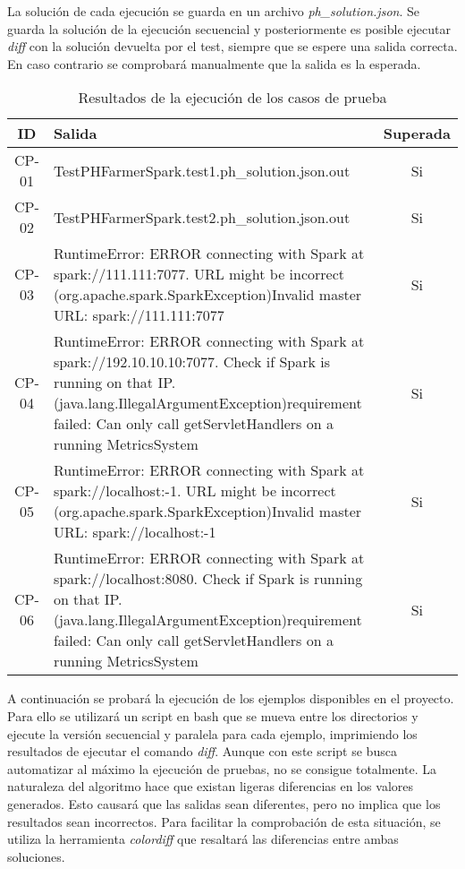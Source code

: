 La solución de cada ejecución se guarda en un archivo \textit{ph\_solution.json}. Se guarda la solución de la ejecución secuencial y posteriormente es posible ejecutar \textit{diff} con la solución devuelta por el test, siempre que se espere una salida correcta. En caso contrario se comprobará manualmente que la salida es la esperada.\\

\begin{table} [H]
    \begin{tabularx}{\linewidth}{|c|X|c|}
        \hline
        \textbf{ID} & \centering \textbf{Salida} & \textbf{Superada} \tabularnewline
        \hline
        CP-01 & TestPHFarmerSpark.test1.ph\_solution.json.out & Si \tabularnewline
        \hline
        CP-02 & TestPHFarmerSpark.test2.ph\_solution.json.out & Si \tabularnewline
        \hline
        CP-03 & RuntimeError: ERROR connecting with Spark at spark://111.111:7077. URL might be incorrect (org.apache.spark.SparkException)Invalid master URL: spark://111.111:7077 & Si \tabularnewline
        \hline
        CP-04 & RuntimeError: ERROR connecting with Spark at spark://192.10.10.10:7077. Check if Spark is running on that IP. (java.lang.IllegalArgumentException)requirement failed: Can only call getServletHandlers on a running MetricsSystem & Si \tabularnewline
        \hline
        CP-05 & RuntimeError: ERROR connecting with Spark at spark://localhost:-1. URL might be incorrect (org.apache.spark.SparkException)Invalid master URL: spark://localhost:-1 & Si \tabularnewline
        \hline
        CP-06 & RuntimeError: ERROR connecting with Spark at spark://localhost:8080. Check if Spark is running on that IP. (java.lang.IllegalArgumentException)requirement failed: Can only call getServletHandlers on a running MetricsSystem & Si \tabularnewline
        \hline
    \end{tabularx}
    \caption{Resultados de la ejecución de los casos de prueba}
    \label{tab:test-results}
\end{table}

A continuación se probará la ejecución de los ejemplos disponibles en el proyecto. Para ello se utilizará un script en bash que se mueva entre los directorios y ejecute la versión secuencial y paralela para cada ejemplo, imprimiendo los resultados de ejecutar el comando \textit{diff}. Aunque con este script se busca automatizar al máximo la ejecución de pruebas, no se consigue totalmente. La naturaleza del algoritmo hace que existan ligeras diferencias en los valores generados. Esto causará que las salidas sean diferentes, pero no implica que los resultados sean incorrectos. 
Para facilitar la comprobación de esta situación, se utiliza la herramienta \textit{colordiff} que resaltará las diferencias entre ambas soluciones.\\

